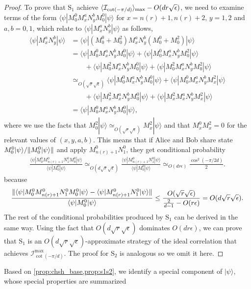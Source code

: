 \documentclass[11pt,letterpaper]{article}
\newcommand{\ket}[1]{|#1\rangle}
\newcommand{\bra}[1]{\langle#1|}
\DeclarePairedDelimiter{\norm}{\lVert}{\rVert}
\DeclarePairedDelimiter{\ip}{\langle}{\rangle}
\newcommand{\1}{\mathbb{1}}
\newcommand{\nr}{n(r)}
\newcommand{\bS}{\mathrm{S}}
\newcommand{\I}{\mathcal{I}}
\newcommand{\ep}{\epsilon}
\newcommand{\se}{\sqrt{\epsilon}}
\newcommand{\sr}{\sqrt{r}}
\newcommand{\appd}[1]{\simeq_{#1}}
\theoremstyle{definition}
\begin{document}
\begin{proof}
To prove that $\bS_1$ achieve $\ip{\I_{\cot(-\pi/d)}}_{\max} - O(d r\se)$, we need to examine terms of the form
$\bra{\psi} M_0^0 M_{x}^a N_y^b M_0^0\ket{\psi}$ for $x = \nr+1,\nr+2$, $y=1,2$ and $a,b = 0,1$,
which relate to $\bra{\psi} M_x^a N_y^b \ket{\psi}$ as follows,
\begin{align*}
	   \bra{\psi} M_{x}^aN_y^b \ket{\psi} 
	&= \bra{\psi}(M_0^0 + M_0^2) M_x^a N_y^b (M_0^0 + M_0^2)\ket{\psi} \\
	&=  \bra{\psi}M_0^0 M_x^aN_y^b M_0^0\ket{\psi} + \bra{\psi}M_0^0 M_x^aN_y^b M_0^2\ket{\psi}\\
	&\quad\quad+\bra{\psi}M_0^2 M_x^aN_y^b M_0^0\ket{\psi} + \bra{\psi}M_0^2 M_x^aN_y^b M_0^2\ket{\psi}\\
	&\appd{O(\sr\se)}  \bra{\psi}M_0^0 M_x^aN_y^b M_0^0\ket{\psi} + \bra{\psi}M_0^0 M_x^aN_y^b M_x^2\ket{\psi} \\
	&\quad \quad +\bra{\psi}M_x^2 M_x^aN_y^b M_0^0\ket{\psi} + \bra{\psi}M_x^2 M_x^aN_y^b M_x^2\ket{\psi}\\
	&=\bra{\psi}M_0^0 M_x^aN_y^b M_0^0\ket{\psi},
\end{align*}
where we use the facts that $M_0^2 \ket{\psi} \appd{O(\sr \se)} M_x^2 \ket{\psi}$ and that 
$M_x^0 M_x^2 = 0$ for the relevant values of $(x,y,a,b)$.
This means that if Alice and Bob share state $M_0^0 \ket{\psi}/\norm{M_0^0 \ket{\psi}}$ and apply $M_{\nr+1}^0N_1^0$,
they get conditional probability
\begin{align*}
	\frac{\bra{\psi}M_0^0 M_{\nr+1}^0N_1^0 M_0^0\ket{\psi}}{\bra{\psi} M_0^0 \ket{\psi}}  
	\appd{O(d \sr \se)} \frac{\bra{\psi} M_{\nr+1}^0N_1^0 \ket{\psi}}{\bra{\psi} M_0^0 \ket{\psi}}
	\appd{O(d r \ep)}
	\frac{\cos^2(-\pi/2d)}{2}.
\end{align*} 
because
\begin{align*}
	\frac{ \norm{\bra{\psi}M_0^0 M_{\nr+1}^0N_1^0 M_0^0\ket{\psi} -  \bra{\psi} M_{\nr+1}^0N_1^0 \ket{\psi}}}
	{\bra{\psi} M_0^0 \ket{\psi}} \leq \frac{O(\sr\se)}{\frac{2}{d-1} - O(r \ep)} = O(d \sr \se).
\end{align*}
The rest of the conditional probabilities produced by $\bS_1$ can be derived in the same way.
Using the fact that $O(d \sr \se)$ dominates $O(d r \ep)$,
we can prove that $\bS_1$ is an $O(d \sr\se)$-approximate strategy of the ideal correlation that achieves $\I_{\cot(-\pi/d)}^{\max}$.
The proof for $\bS_2$ is analogous so we omit it here.
\end{proof}
Based on \cref{prop:chsh_base,prop:s1s2}, we identify a special component of $\ket{\psi}$, whose special properties are summarized
\end{document}
